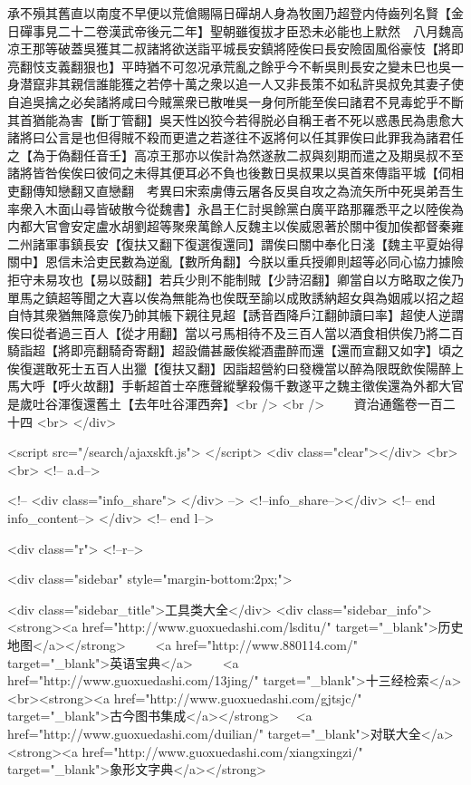 承不殞其舊直以南度不早便以荒傖賜隔日磾胡人身為牧圉乃超登内侍齒列名賢【金日磾事見二十二卷漢武帝後元二年】聖朝雖復拔才臣恐未必能也上默然　八月魏高凉王那等破蓋吳獲其二叔諸將欲送詣平城長安鎮將陸俟曰長安險固風俗豪忮【將即亮翻忮支義翻狠也】平時猶不可忽况承荒亂之餘乎今不斬吳則長安之變未巳也吳一身潜竄非其親信誰能獲之若停十萬之衆以追一人又非長策不如私許吳叔免其妻子使自追吳擒之必矣諸將咸曰今賊黨衆已散唯吳一身何所能至俟曰諸君不見毒蛇乎不斷其首猶能為害【斷丁管翻】吳天性凶狡今若得脱必自稱王者不死以惑愚民為患愈大諸將曰公言是也但得賊不殺而更遣之若遂往不返將何以任其罪俟曰此罪我為諸君任之【為于偽翻任音壬】高凉王那亦以俟計為然遂赦二叔與刻期而遣之及期吳叔不至諸將皆咎俟俟曰彼伺之未得其便耳必不負也後數日吳叔果以吳首來傳詣平城【伺相吏翻傳知戀翻又直戀翻　考異曰宋索虜傳云屠各反吳自攻之為流矢所中死吳弟吾生率衆入木面山尋皆破散今從魏書】永昌王仁討吳餘黨白廣平路那羅悉平之以陸俟為内都大官會安定盧水胡劉超等聚衆萬餘人反魏主以俟威恩著於關中復加俟都督秦雍二州諸軍事鎮長安【復扶又翻下復選復還同】謂俟曰關中奉化日淺【魏主平夏始得關中】恩信未洽吏民數為逆亂【數所角翻】今朕以重兵授卿則超等必同心協力據險拒守未易攻也【易以豉翻】若兵少則不能制賊【少詩沼翻】卿當自以方略取之俟乃單馬之鎮超等聞之大喜以俟為無能為也俟既至諭以成敗誘納超女與為姻戚以招之超自恃其衆猶無降意俟乃帥其帳下親往見超【誘音酉降戶江翻帥讀曰率】超使人逆謂俟曰從者過三百人【從才用翻】當以弓馬相待不及三百人當以酒食相供俟乃將二百騎詣超【將即亮翻騎奇寄翻】超設備甚嚴俟縱酒盡醉而還【還而宣翻又如字】頃之俟復選敢死士五百人出獵【復扶又翻】因詣超營約曰發機當以醉為限既飲俟陽醉上馬大呼【呼火故翻】手斬超首士卒應聲縱擊殺傷千數遂平之魏主徵俟還為外都大官　是歲吐谷渾復還舊土【去年吐谷渾西奔】<br />
<br />
　　資治通鑑卷一百二十四  <br>
   </div> 

<script src="/search/ajaxskft.js"> </script>
 <div class="clear"></div>
<br>
<br>
 <!-- a.d-->

 <!--
<div class="info_share">
</div> 
-->
 <!--info_share--></div>   <!-- end info_content-->
  </div> <!-- end l-->

<div class="r">   <!--r-->



<div class="sidebar"  style="margin-bottom:2px;">

 
<div class="sidebar_title">工具类大全</div>
<div class="sidebar_info">
<strong><a href="http://www.guoxuedashi.com/lsditu/" target="_blank">历史地图</a></strong>　　
<a href="http://www.880114.com/" target="_blank">英语宝典</a>　　
<a href="http://www.guoxuedashi.com/13jing/" target="_blank">十三经检索</a>　
<br><strong><a href="http://www.guoxuedashi.com/gjtsjc/" target="_blank">古今图书集成</a></strong>　
<a href="http://www.guoxuedashi.com/duilian/" target="_blank">对联大全</a>　<strong><a href="http://www.guoxuedashi.com/xiangxingzi/" target="_blank">象形文字典</a></strong>　

